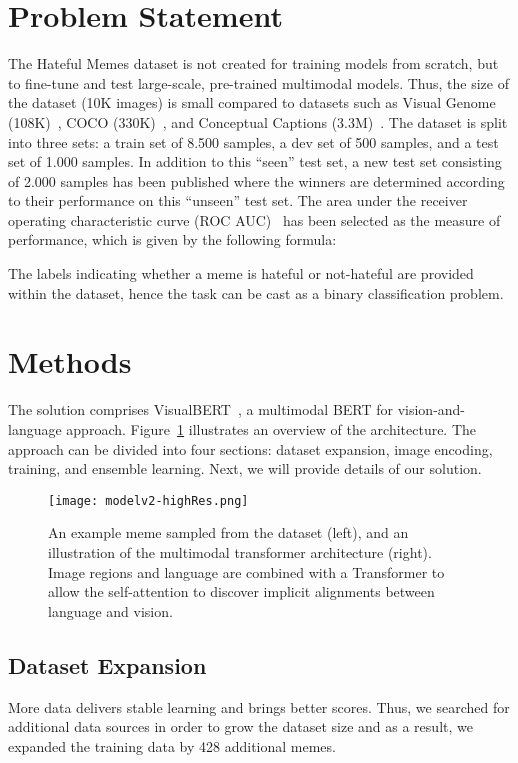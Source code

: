 \documentclass{article}
\begin{document}
\section{Problem Statement}
\label{prob}


  The Hateful Memes dataset is not created for training models from scratch, but to fine-tune and test large-scale, pre-trained multimodal models. Thus, the size of the dataset (10K images) is small compared to datasets such as Visual Genome (108K)~\cite{krishna2017visual}, COCO (330K)~\cite{chen2015microsoft}, and Conceptual Captions (3.3M)~\cite{sharma2018conceptual}. The dataset is split into three sets: a train set of 8.500 samples, a dev set of 500 samples, and a test set of 1.000 samples. In addition to this ``seen'' test set, a new test set consisting of 2.000 samples has been published where the winners are determined according to their performance on this ``unseen'' test set. The area under the receiver operating characteristic curve (ROC AUC)~\cite{bradley1997use} has been selected as the measure of performance, which is given by the following formula:
  
  The labels indicating whether a meme is hateful or not-hateful are provided within the dataset, hence the task can be cast as a binary classification problem.


\section{Methods}
\label{methods}


The solution comprises VisualBERT~\cite{li2019visualbert}, a multimodal BERT for vision-and-language approach. Figure~\ref{fig:model} illustrates an overview of the architecture. The approach can be divided into four sections: dataset expansion, image encoding, training, and ensemble learning. Next, we will provide details of our solution.

\begin{figure} 
  \texttt{[image: modelv2-highRes.png]}
\caption{An example meme sampled from the dataset (left), and an illustration of the multimodal transformer architecture (right). Image regions and language are combined with a Transformer to allow the self-attention to discover implicit alignments between language and vision.}
  \centering
  \label{fig:model}
\end{figure}

\subsection{Dataset Expansion}
  More data delivers stable learning and brings better scores. Thus, we searched for additional data sources in order to grow the dataset size and as a result, we expanded the training data by 428 additional memes.
  
\end{document}
